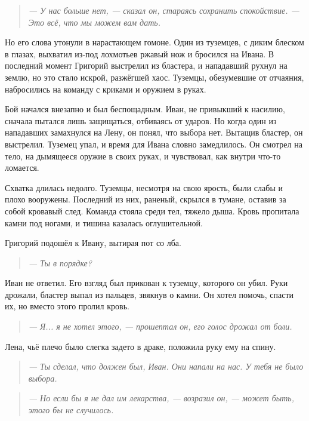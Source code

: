 \documentclass[12pt,a4paper]{book}
\newenvironment{dialogue}{\begin{quote}\itshape}{\end{quote}} %
\begin{document}
\begin{dialogue}
--- У нас больше нет, --- сказал он, стараясь сохранить спокойствие. --- Это всё, что мы можем вам дать.
\end{dialogue}

Но его слова утонули в нарастающем гомоне. Один из туземцев, с диким блеском в глазах, выхватил из-под лохмотьев ржавый нож и бросился на Ивана. В последний момент Григорий выстрелил из бластера, и нападавший рухнул на землю, но это стало искрой, разжёгшей хаос. Туземцы, обезумевшие от отчаяния, набросились на команду с криками и оружием в руках.

Бой начался внезапно и был беспощадным. Иван, не привыкший к насилию, сначала пытался лишь защищаться, отбиваясь от ударов. Но когда один из нападавших замахнулся на Лену, он понял, что выбора нет. Вытащив бластер, он выстрелил. Туземец упал, и время для Ивана словно замедлилось. Он смотрел на тело, на дымящееся оружие в своих руках, и чувствовал, как внутри что-то ломается.

Схватка длилась недолго. Туземцы, несмотря на свою ярость, были слабы и плохо вооружены. Последний из них, раненый, скрылся в тумане, оставив за собой кровавый след. Команда стояла среди тел, тяжело дыша. Кровь пропитала камни под ногами, и тишина казалась оглушительной.

Григорий подошёл к Ивану, вытирая пот со лба.

\begin{dialogue}
--- Ты в порядке?
\end{dialogue}

Иван не ответил. Его взгляд был прикован к туземцу, которого он убил. Руки дрожали, бластер выпал из пальцев, звякнув о камни. Он хотел помочь, спасти их, но вместо этого пролил кровь.

\begin{dialogue}
--- Я... я не хотел этого, --- прошептал он, его голос дрожал от боли.
\end{dialogue}

Лена, чьё плечо было слегка задето в драке, положила руку ему на спину.

\begin{dialogue}
--- Ты сделал, что должен был, Иван. Они напали на нас. У тебя не было выбора.
\end{dialogue}

\begin{dialogue}
--- Но если бы я не дал им лекарства, --- возразил он, --- может быть, этого бы не случилось.
\end{dialogue}
\end{document}
